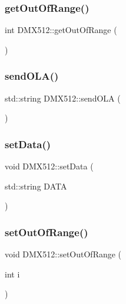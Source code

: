 \subsubsection{\texorpdfstring{get\+Out\+Of\+Range()}{getOutOfRange()}}
{\footnotesize\ttfamily int D\+M\+X512\+::get\+Out\+Of\+Range (\begin{DoxyParamCaption}{ }\end{DoxyParamCaption})}

\mbox{\label{classDMX512_adb00c53d6367188e848fea660d31da28}} 
\subsubsection{\texorpdfstring{send\+O\+L\+A()}{sendOLA()}}
{\footnotesize\ttfamily std\+::string D\+M\+X512\+::send\+O\+LA (\begin{DoxyParamCaption}{ }\end{DoxyParamCaption})}

\mbox{\label{classDMX512_af7b430f6b8c50ad34773c2f83eaa3db9}} 
\subsubsection{\texorpdfstring{set\+Data()}{setData()}}
{\footnotesize\ttfamily void D\+M\+X512\+::set\+Data (\begin{DoxyParamCaption}\item[{std\+::string}]{D\+A\+TA }\end{DoxyParamCaption})}

\mbox{\label{classDMX512_ad392198ed2202ea28a78764ba1d9c453}} 
\subsubsection{\texorpdfstring{set\+Out\+Of\+Range()}{setOutOfRange()}}
{\footnotesize\ttfamily void D\+M\+X512\+::set\+Out\+Of\+Range (\begin{DoxyParamCaption}\item[{int}]{i }\end{DoxyParamCaption})}



